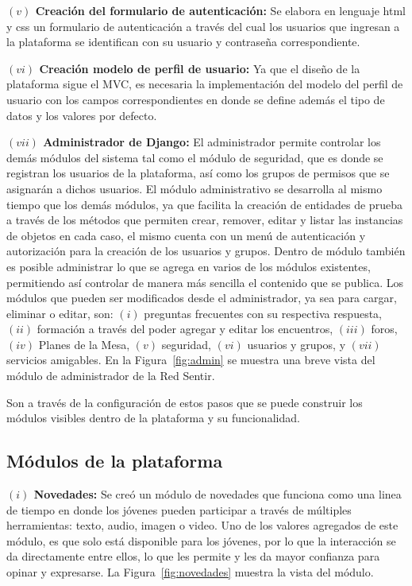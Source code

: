 \documentclass[journal,transmag]{IEEEtran}
\begin{document}
\textbf{$(v)$ Creación del formulario de autenticación:} Se elabora en lenguaje html y css un formulario de autenticación a través del cual los usuarios que ingresan a la plataforma se identifican con su usuario y contraseña correspondiente.

\textbf{$(vi)$ Creación modelo de perfil de usuario:} Ya que el diseño de la plataforma sigue el MVC, es necesaria la implementación del modelo del perfil de usuario con los campos correspondientes en donde se define además el tipo de datos y los valores por defecto.

\textbf{$(vii)$ Administrador de Django:} El administrador permite controlar los demás módulos del sistema tal como el módulo de seguridad, que es donde se registran los usuarios de la plataforma, así como los grupos de permisos que se asignarán a dichos usuarios. El módulo administrativo se desarrolla al mismo tiempo que los demás módulos, ya que facilita la creación de entidades de prueba a través de los métodos que permiten crear, remover, editar y listar  las instancias de objetos en cada caso, el mismo cuenta con un menú de autenticación y autorización para la creación de los usuarios y grupos. Dentro de módulo también es posible administrar lo que se agrega en varios de los módulos existentes, permitiendo así controlar de manera más sencilla el contenido que se publica. Los módulos que pueden ser modificados desde el administrador, ya sea para cargar, eliminar o editar, son: $(i)$ preguntas frecuentes con su respectiva respuesta, $(ii)$ formación a través del poder agregar y editar los encuentros, $(iii)$ foros, $(iv)$ Planes de la Mesa, $(v)$ seguridad, $(vi)$ usuarios y grupos, y $(vii)$ servicios amigables. En la Figura~\ref{fig:admin} se muestra una breve vista del módulo de administrador de la Red Sentir.

Son a través de la configuración de estos pasos que se puede construir los módulos visibles dentro de la plataforma y su funcionalidad.

\subsection{Módulos de la plataforma}

\textbf{$(i)$ Novedades:} Se creó un módulo de novedades que funciona como una linea de tiempo en donde los jóvenes pueden participar a través de múltiples herramientas: texto,  audio, imagen o video. Uno de los valores agregados de este módulo, es que solo está disponible para los jóvenes, por lo que la interacción se da directamente entre ellos, lo que les permite y les da mayor confianza para opinar y expresarse. La Figura~\ref{fig:novedades} muestra la vista del módulo.
\end{document}
